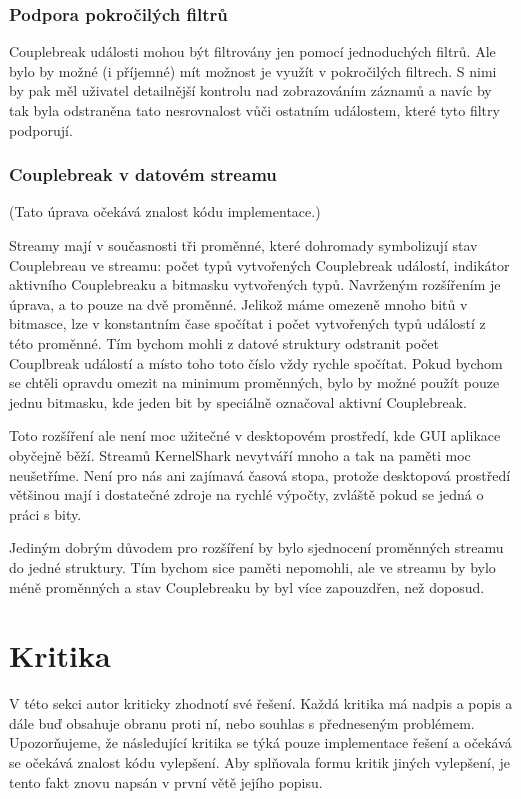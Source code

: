 \subsubsection*{Podpora pokročilých filtrů}
Couplebreak události mohou být filtrovány jen pomocí jednoduchých filtrů. Ale bylo by možné (i příjemné) mít možnost je využít v pokročilých filtrech. S nimi by pak měl uživatel detailnější kontrolu nad zobrazováním záznamů a navíc by tak byla odstraněna tato nesrovnalost vůči ostatním událostem, které tyto filtry podporují.

\subsubsection*{Couplebreak v datovém streamu}
(Tato úprava očekává znalost kódu implementace.)

Streamy mají v současnosti tři proměnné, které dohromady symbolizují stav Couplebreau ve streamu: počet typů vytvořených Couplebreak událostí, indikátor aktivního Couplebreaku a bitmasku vytvořených typů. Navrženým rozšířením je úprava, a to pouze na dvě proměnné. Jelikož máme omezeně mnoho bitů v bitmasce, lze v konstantním čase spočítat i počet vytvořených typů událostí z této proměnné. Tím bychom mohli z datové struktury odstranit počet Couplbreak událostí a místo toho toto číslo vždy rychle spočítat. Pokud bychom se chtěli opravdu omezit na minimum proměnných, bylo by možné použít pouze jednu bitmasku, kde jeden bit by speciálně označoval aktivní Couplebreak.

Toto rozšíření ale není moc užitečné v desktopovém prostředí, kde GUI aplikace obyčejně běží. Streamů KernelShark nevytváří mnoho a tak na paměti moc neušetříme. Není pro nás ani zajímavá časová stopa, protože desktopová prostředí většinou mají i dostatečné zdroje na rychlé výpočty, zvláště pokud se jedná o práci s bity.

Jediným dobrým důvodem pro rozšíření by bylo sjednocení proměnných streamu do jedné struktury. Tím bychom sice paměti nepomohli, ale ve streamu by bylo méně proměnných a stav Couplebreaku by byl více zapouzdřen, než doposud.

\section{Kritika}
V této sekci autor kriticky zhodnotí své řešení. Každá kritika má nadpis a popis a dále buď obsahuje obranu proti ní, nebo souhlas s předneseným problémem. Upozorňujeme, že následující kritika se týká pouze implementace řešení a očekává se očekává znalost kódu vylepšení. Aby splňovala formu kritik jiných vylepšení, je tento fakt znovu napsán v první větě jejího popisu.

